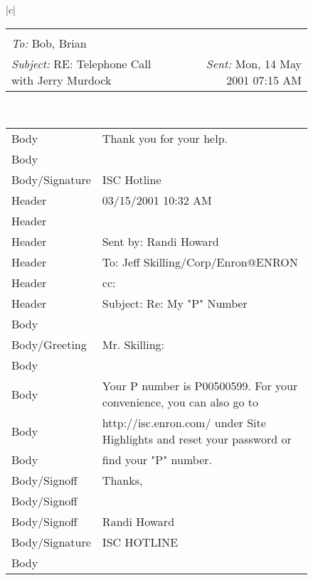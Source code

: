 \documentclass{llncs}
\begin{document}
\begin{figure}
\centering
\begin{tabular}{|c|}
	\hline 
	\scriptsize{
	\begin{tabular*}{\textwidth}{@{\extracolsep{\fill}}lr}
		\makecell{
			\textit{From:} Alice\\ 
			\textit{To:} Bob, Brian\\
			\textit{Subject:} RE: Telephone Call with Jerry Murdock
		} &
		\hspace*{\fill} { \textit{Sent:} Mon, 14 May 2001 07:15 AM}
	\end{tabular*}
}
	\\ 
	\hline 
	\scriptsize{
	\begin{tabular*}{\textwidth}{l|l} 
		Body           & Thank you for your help. \\
		Body           & \\
		Body/Signature & ISC Hotline\\\hline
		Header         & 03/15/2001 10:32 AM \\
		Header         & \\
		Header         & Sent by: Randi Howard \\
		Header         & To: Jeff Skilling/Corp/Enron@ENRON\\
		Header         & cc:\\
		Header         & Subject: Re: My "P" Number\\\hline
		Body           & \\
		Body/Greeting  & Mr. Skilling: \\
		Body           & \\
		Body           & Your P number is P00500599.  For your convenience, you can also go to\\
		Body           & http://isc.enron.com/ under Site Highlights and reset your password or \\
		Body           & find your "P" number.\\
		Body/Signoff   & Thanks,\\
		Body/Signoff   & \\
		Body/Signoff   & Randi Howard\\
		Body/Signature & ISC HOTLINE\\
		Body           & \\\hline

\end{tabular*}}
\end{tabular}
\end{figure}
\end{document}
